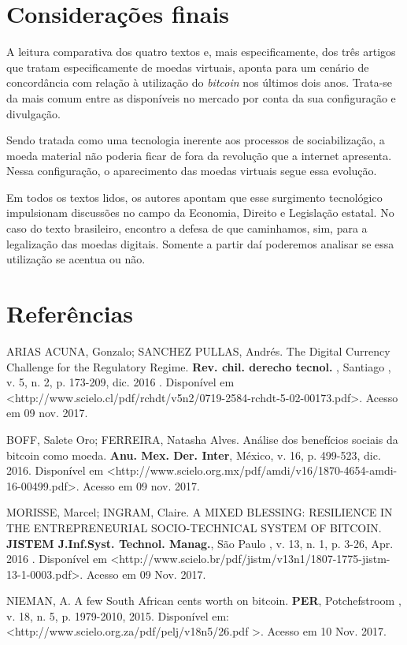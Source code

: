 \documentclass[12pt]{article}
\begin{document}
\section{Considerações finais}

A leitura comparativa dos quatro textos e, mais especificamente, dos três artigos que tratam especificamente de moedas virtuais, aponta para um cenário de concordância com relação à utilização do \textit{bitcoin} nos últimos dois anos. Trata-se da mais comum entre as disponíveis no mercado por conta da sua configuração e divulgação.

Sendo tratada como uma tecnologia inerente aos processos de sociabilização, a moeda material não poderia ficar de fora da revolução que a internet apresenta. Nessa configuração, o aparecimento das moedas virtuais segue essa evolução.

Em todos os textos lidos, os autores apontam que esse surgimento tecnológico impulsionam discussões no campo da Economia, Direito e Legislação estatal. No caso do texto brasileiro, encontro a defesa de que caminhamos, sim, para a legalização das moedas digitais. Somente a partir daí poderemos analisar se essa utilização se acentua ou não.

\section{Referências}

ARIAS ACUNA, Gonzalo; SANCHEZ PULLAS, Andrés. The Digital Currency Challenge for the Regulatory Regime. \textbf{Rev. chil. derecho tecnol.}  , Santiago , v. 5, n. 2, p. 173-209, dic. 2016 . Disponível em \textless http://www.scielo.cl/pdf/rchdt/v5n2/0719-2584-rchdt-5-02-00173.pdf\textgreater. Acesso em 09 nov. 2017.

\noindent BOFF, Salete Oro; FERREIRA, Natasha Alves. Análise dos benefícios sociais da bitcoin como moeda. \textbf{Anu. Mex. Der. Inter}, México, v. 16, p. 499-523, dic. 2016. Disponível em \textless http://www.scielo.org.mx/pdf/amdi/v16/1870-4654-amdi-16-00499.pdf\textgreater. Acesso em 09 nov. 2017.

\noindent MORISSE, Marcel; INGRAM, Claire. A MIXED BLESSING: RESILIENCE IN THE ENTREPRENEURIAL SOCIO-TECHNICAL SYSTEM OF BITCOIN. \textbf{ JISTEM J.Inf.Syst. Technol. Manag.},  São Paulo ,  v. 13, n. 1, p. 3-26,  Apr.  2016 .   Disponível em \textless http://www.scielo.br/pdf/jistm/v13n1/1807-1775-jistm-13-1-0003.pdf\textgreater. Acesso em  09  Nov.  2017.

\noindent NIEMAN, A. A few South African cents worth on bitcoin. \textbf{PER}, Potchefstroom ,  v. 18, n. 5, p. 1979-2010, 2015.   Disponível em: \textless http://www.scielo.org.za/pdf/pelj/v18n5/26.pdf \textgreater. Acesso em  10  Nov.  2017.
\end{document}
